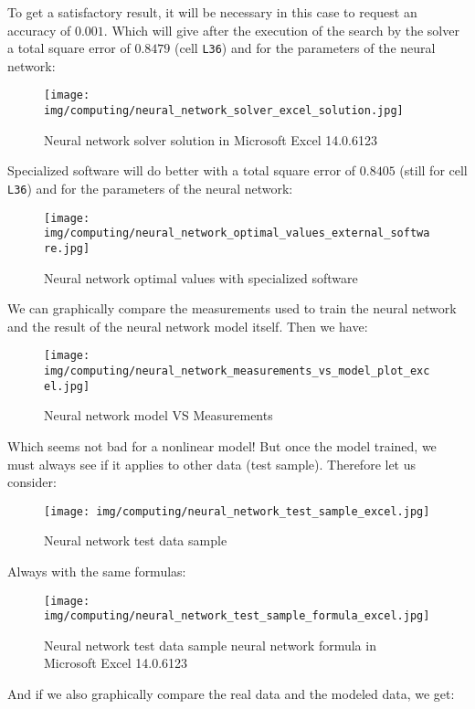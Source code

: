 	\begin{tcolorbox}[colframe=black,colback=white,sharp corners]
	To get a satisfactory result, it will be necessary in this case to request an accuracy of $0.001$. Which will give after the execution of the search by the solver a total square error of $0.8479$ (cell \texttt{L36}) and for the parameters of the neural network:
	\begin{figure}[H]
		\centering
		\texttt{[image: img/computing/neural\_network\_solver\_excel\_solution.jpg]}
		\caption[]{Neural network solver solution in Microsoft Excel 14.0.6123}
	\end{figure}
	Specialized software will do better with a total square error of $0.8405$ (still for cell \texttt{L36}) and for the parameters of the neural network:
	\begin{figure}[H]
		\centering
		\texttt{[image: img/computing/neural\_network\_optimal\_values\_external\_software.jpg]}
		\caption[]{Neural network optimal values with specialized software}
	\end{figure}
	We can graphically compare the measurements used to train the neural network and the result of the neural network model itself. Then we have:
	\end{tcolorbox}
	
	\begin{tcolorbox}[colframe=black,colback=white,sharp corners]
	\begin{figure}[H]
		\centering
		\texttt{[image: img/computing/neural\_network\_measurements\_vs\_model\_plot\_excel.jpg]}
		\caption[]{Neural network model VS Measurements}
	\end{figure}
	Which seems not bad for a nonlinear model! But once the model trained, we must always see if it applies to other data (test sample). Therefore let us consider:
	\begin{figure}[H]
		\centering
		\texttt{[image: img/computing/neural\_network\_test\_sample\_excel.jpg]}
		\caption[]{Neural network test data sample}
	\end{figure}
	Always with the same formulas:
	\begin{figure}[H]
		\centering
		\texttt{[image: img/computing/neural\_network\_test\_sample\_formula\_excel.jpg]}
		\caption[]{Neural network test data sample neural network formula in Microsoft Excel 14.0.6123}
	\end{figure}
	And if we also graphically compare the real data and the modeled data, we get:
	\end{tcolorbox}
	

